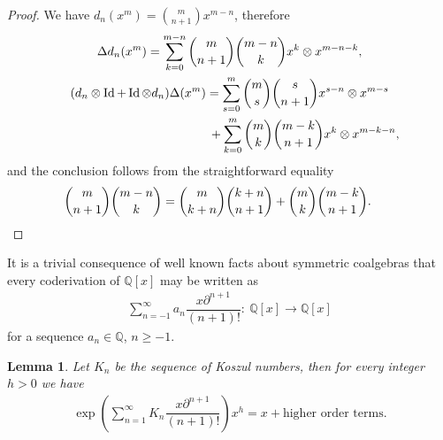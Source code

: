 \documentclass[pdftex]{sigma}
\newcommand{\Q}{\mathbb{Q}}
\numberwithin{equation}{section}
\newtheorem{Lemma}[Theorem]{Lemma}
 { \theoremstyle{definition}
\newtheorem{Definition}[Theorem]{Definition}
\newtheorem{Example}[Theorem]{Example}
\newtheorem{Remark}[Theorem]{Remark} }
\begin{document}
\begin{proof}
We have $d_n(x^m)=\binom{m}{n+1}x^{m-n}$, therefore
\begin{gather*}
\Delta d_n(x^m)= \sum_{k=0}^{m-n}\dbinom{m}{n+1}\binom{m-n}{k}x^k\otimes x^{m-n-k},\\
(d_n\otimes \operatorname{Id}+\operatorname{Id}\otimes d_n)\Delta(x^m)=
\sum_{s=0}^{m}\dbinom{m}{s}\binom{s}{n+1}x^{s-n}\otimes x^{m-s} \\
\hphantom{(d_n\otimes \operatorname{Id}+\operatorname{Id}\otimes d_n)\Delta(x^m)=}{} +
\sum_{k=0}^{m}\dbinom{m}{k}\binom{m-k}{n+1}x^{k}\otimes x^{m-k-n},
\end{gather*}
and the conclusion follows from the straightforward equality
\begin{gather*} \dbinom{m}{n+1}\binom{m-n}{k}=\dbinom{m}{k+n}\binom{k+n}{n+1}+
\dbinom{m}{k}\binom{m-k}{n+1} .\tag*{\qed}
\end{gather*}
\renewcommand{\qed}{}
\end{proof}

It is a trivial consequence of well known facts about symmetric coalgebras that every coderivation of $\Q[x]$ may be written as
\begin{gather*} \sum_{n=-1}^{\infty} a_n\dfrac{x\partial^{n+1}}{(n+1)!}\colon \ \Q[x]\to \Q[x]\end{gather*}
for a sequence $a_n\in \Q$, $n\ge -1$.

\begin{Lemma}\label{lem.dualita} Let $K_n$ be the sequence of Koszul numbers, then for every integer $h>0$ we have
\begin{gather*} \exp\left(\sum_{n=1}^{\infty}K_n \dfrac{x\partial^{n+1}}{(n+1)!}
\right)x^{h}=x+\text{higher order terms}.\end{gather*}
\end{Lemma}
\end{document}
